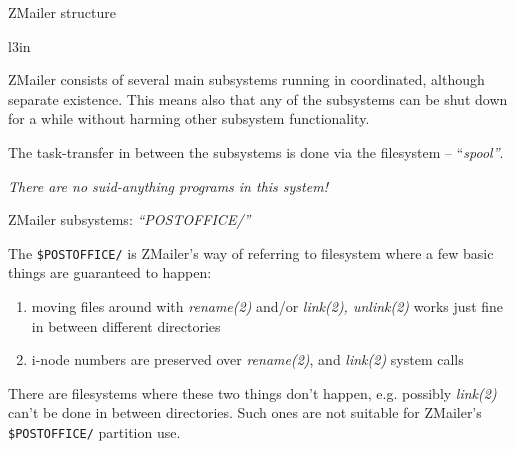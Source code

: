\documentclass[a4paper,landscape]{slides}
\newcommand{\ZM}{ZMailer}
\begin{document}
\begin{slide}

\centerline{\large \ZM{} structure}

\begin{wrapfigure}{l}{3in}
\mbox{
\\
}
\end{wrapfigure}

\ZM{} consists of several main subsystems running in coordinated,
although separate existence.  This means also that any of the subsystems
can be shut down for a while without harming other subsystem functionality.

The task-transfer in between the subsystems is done via
the filesystem -- {``\it spool''}.

\vfill
\centerline{\it There are no suid-anything programs in this system!}

\vfill

\end{slide}



\begin{slide}

\centerline{\large \ZM{} subsystems: {\it ``POSTOFFICE/''}}

The \verb!$POSTOFFICE/! is \ZM{}'s way of referring to filesystem
where a few basic things are guaranteed to happen:
\begin{enumerate}
\item moving files around with {\it rename(2)} and/or {\it link(2), unlink(2)}
      works just fine in between different directories
\item i-node numbers are preserved over {\it rename(2)}, and {\it link(2)}
	system calls
\end{enumerate}

There are filesystems where these two things don't happen, e.g. possibly
{\it link(2)} can't be done in between directories.  Such ones are not
suitable for \ZM's \verb!$POSTOFFICE/! partition use.
\vfill

\end{slide}

\end{document}
